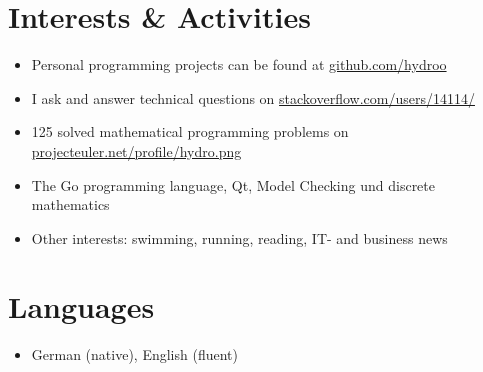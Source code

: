 \vspace{0.66cm} %

\customhrule
\section*{Interests \& Activities}
\begin{itemize}
	\item Personal programming projects can be found at \href{https://github.com/hydroo}{github.com/hydroo}
	\item I ask and answer technical questions on \href{http://stackoverflow.com/users/14114/}{stackoverflow.com/users/14114/}
	\item 125 solved mathematical programming problems on \href{http://projecteuler.net/profile/hydro.png}{projecteuler.net/profile/hydro.png}
	\item The Go programming language, Qt, Model Checking und discrete mathematics
	\item Other interests: swimming, running, reading, IT- and business news
\end{itemize}

\customhrule
\section*{Languages}
\begin{itemize}
	\item German (native), English (fluent)
\end{itemize}


